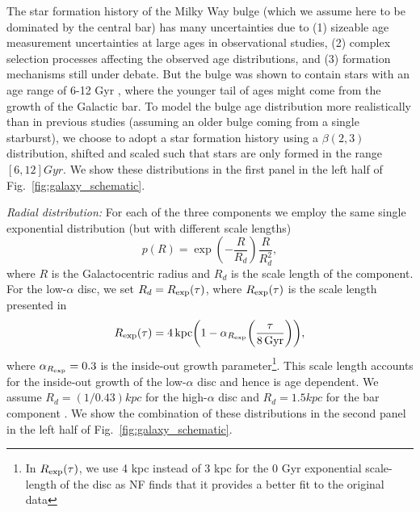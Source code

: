 The star formation history of the Milky Way bulge (which we assume here to be dominated by the central bar) has many uncertainties due to (1) sizeable age measurement uncertainties at large ages in observational studies, (2) complex selection processes affecting the observed age distributions, and (3) formation mechanisms still under debate. But the bulge was shown to contain stars with an age range of 6-12 Gyr \citep[e.g.,][]{Bovy+2019}, where the younger tail of ages might come from the growth of the Galactic bar. To model the bulge age distribution more realistically than in previous studies (assuming an older bulge coming from a single starburst), we choose to adopt a star formation history using a $\beta(2,3)$ distribution, shifted and scaled such that stars are only formed in the range $[6, 12] \unit{Gyr}$. We show these distributions in the first panel in the left half of Fig.~\ref{fig:galaxy_schematic}.

\textit{Radial distribution:} For each of the three components we employ the same single exponential distribution (but with different scale lengths)
\begin{equation}\label{eq:galaxy_R}
    p(R) = \exp(-\frac{R}{R_d}) \frac{R}{R_d^2},
\end{equation}
where $R$ is the Galactocentric radius and $R_d$ is the scale length of the component. For the low-$\alpha$ disc, we set $R_d = R_{\rm exp}(\tau)$, where $R_{\rm exp}(\tau)$ is the scale length presented in \citet[][Eq.~5]{Frankel+2018}
\begin{equation}
    R_{\rm exp}(\tau) = 4 \unit{kpc} \qty(1 - \alpha_{R_{\rm exp}} \qty(\frac{\tau}{8 \unit{Gyr}})),
\end{equation}
where $\alpha_{R_{\rm exp}} = 0.3$ is the inside-out growth parameter\footnote{In $R_{\rm exp}(\tau)$, we use 4 kpc instead of 3 kpc for the 0 Gyr exponential scale-length of the disc as NF finds that it provides a better fit to the original data}. This scale length accounts for the inside-out growth of the low-$\alpha$ disc and hence is age dependent. We assume $R_d = (1 / 0.43) \unit{kpc}$ for the high-$\alpha$ disc \citep[][Table~1]{Bovy+2016} and $R_d = 1.5 \unit{kpc}$ for the bar component \citep{Bovy+2019}. We show the combination of these distributions in the second panel in the left half of Fig.~\ref{fig:galaxy_schematic}.

